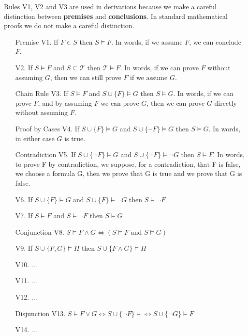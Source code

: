 Rules V1, V2 and V3 are used in derivations because we make a careful distinction between \textbf{premises} and \textbf{conclusions}. In standard mathematical proofs we do not make a careful distinction.

\begin{enumerate}
\item[Premise V1.] If $F\in S$ then $S\vDash F$. In words, if we assume $F$, we can conclude $F$.
\item[V2.] If $S\vDash F$ and $S\subseteq \mathcal{T}$ then $\mathcal{T}\vDash F$. In words, if we can prove $F$ without assuming $G$, then we can still prove $F$ if we assume $G$.
\item[Chain Rule V3.] If $S\vDash F$ and $S\cup \{F\}\vDash G$ then $S\vDash G$. In words, if we can prove $F$, and by assuming $F$ we can prove $G$, then we can prove $G$ directly without assuming $F$.
\item[Proof by Cases V4.] If $S\cup \{F\}\vDash G$ and $S\cup \{\neg F\}\vDash G$ then $S\vDash G$. In words, in either case $G$ is true.
\item[Contradiction V5.] If $S\cup \{\neg F\} \vDash G$ and $S\cup \{\neg F\} \vDash \neg G$ then $S\vDash F$. In words, to prove F by contradiction, we suppose, for a contradiction, that F is false, we choose a formula G, then we prove that G is true and we prove that G is false.
\item[V6.] If $S\cup \{ F\} \vDash G$ and $S\cup \{ F\} \vDash \neg G$ then $S\vDash \neg F$
\item[V7.] If $S\vDash F$ and $S\vDash \neg F$ then $S\vDash G$
\item[Conjunction V8.] $S\vDash F\wedge G \Longleftrightarrow (S\vDash F \text{ and } S\vDash G)$
\item[V9.] If $S\cup \{F,G\} \vDash H$ then $S\cup \{F\wedge G\}\vDash H$
\item[V10.] ...
\item[V11.] ...
\item[V12.] ...
\item[Disjunction V13.] $S\vDash F\vee G \Longleftrightarrow S\cup \{\neg F\}\vDash \Longleftrightarrow S\cup \{\neg G\}\vDash F$
\item[V14.] ...
\end{enumerate}


